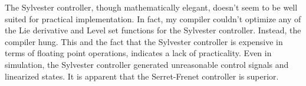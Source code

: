 \documentclass[oneside, 11pt]{book}
\begin{document}
The Sylvester controller, though mathematically elegant, doesn't seem to be well suited for practical implementation. In fact, my compiler couldn't optimize any of the Lie derivative and Level set functions for the Sylvester controller. Instead, the compiler hung. This and the fact that the Sylvester controller is expensive in terms of floating point operations, indicates a lack of practicality. Even in simulation, the Sylvester controller generated unreasonable control signals and linearized states. It is apparent that the Serret-Frenet controller is superior.

\backmatter
\cleardoublepage
{}
{}
\printbibliography[title=References]

\cleardoublepage
{}
{}
\printindex
\end{document}
